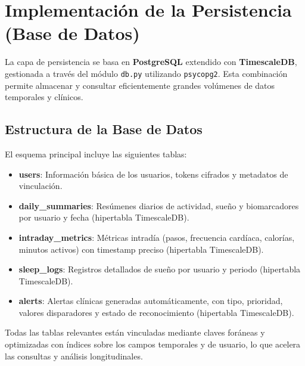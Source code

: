 \section{Implementación de la Persistencia (Base de Datos)}
\label{sec:impl_persistencia}

La capa de persistencia se basa en \textbf{PostgreSQL} extendido con \textbf{TimescaleDB}, gestionada a través del módulo \texttt{db.py} utilizando \texttt{psycopg2}. Esta combinación permite almacenar y consultar eficientemente grandes volúmenes de datos temporales y clínicos.

\subsection{Estructura de la Base de Datos}
El esquema principal incluye las siguientes tablas:
\begin{itemize}
    \item \textbf{users}: Información básica de los usuarios, tokens cifrados y metadatos de vinculación.
    \item \textbf{daily\_summaries}: Resúmenes diarios de actividad, sueño y biomarcadores por usuario y fecha (hipertabla TimescaleDB).
    \item \textbf{intraday\_metrics}: Métricas intradía (pasos, frecuencia cardíaca, calorías, minutos activos) con timestamp preciso (hipertabla TimescaleDB).
    \item \textbf{sleep\_logs}: Registros detallados de sueño por usuario y periodo (hipertabla TimescaleDB).
    \item \textbf{alerts}: Alertas clínicas generadas automáticamente, con tipo, prioridad, valores disparadores y estado de reconocimiento (hipertabla TimescaleDB).
\end{itemize}
Todas las tablas relevantes están vinculadas mediante claves foráneas y optimizadas con índices sobre los campos temporales y de usuario, lo que acelera las consultas y análisis longitudinales.


